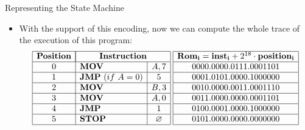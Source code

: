 \begin{frame}[allowframebreaks]{Representing the State Machine}
\begin{itemize}
\item With the support of this encoding, now we can compute the whole trace of the execution of this program:
\[
\begin{array}{|c|l|c|c|}
\hline
\mathbf{Position} & \multicolumn{2}{|c|}{\mathbf{Instruction}} \\ \hline
0 & \mathbf{MOV} & A, 7 \\ \hline
1 & \mathbf{JMP}~(if~A = 0) & 5 \\ \hline
2 & \mathbf{MOV} & B, 3 \\ \hline
3 & \mathbf{MOV} & A, 0 \\ \hline
4 & \mathbf{JMP} & 1 \\ \hline
5 & \mathbf{STOP} & \emptyset \\ \hline
\end{array}
\hspace{0.1cm}
\begin{array}{|c|c|}
\hline
\mathbf{Rom_i} = \mathbf{inst_i} + 2^{18} \cdot \mathbf{position_i} \\ \hline
0000.0000.0111.0001101 \\ \hline
0001.0101.0000.1000000 \\ \hline
0010.0000.0011.0001110 \\ \hline
0011.0000.0000.0001101 \\ \hline
0100.0001.0000.1000000 \\ \hline
0101.0000.0000.0000000 \\ \hline
\end{array}
\]


\end{itemize}
\end{frame}
